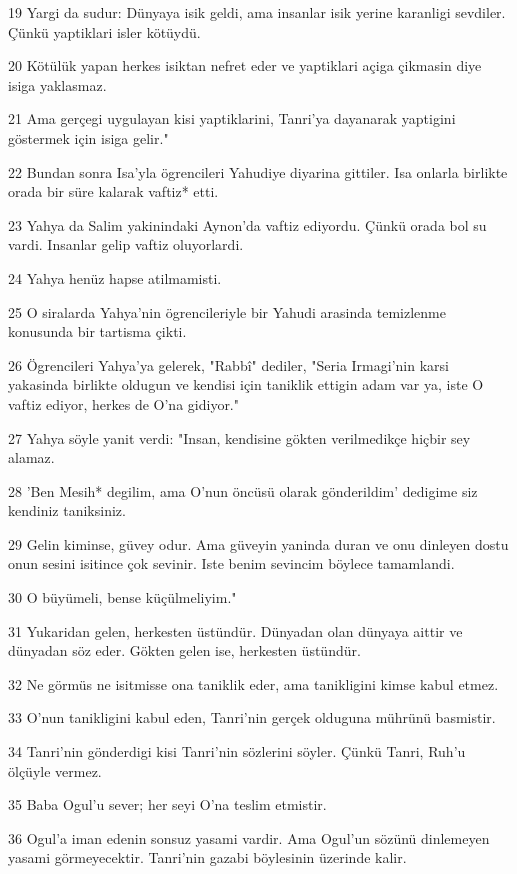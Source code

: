 \par 19 Yargi da sudur: Dünyaya isik geldi, ama insanlar isik yerine karanligi sevdiler. Çünkü yaptiklari isler kötüydü.
\par 20 Kötülük yapan herkes isiktan nefret eder ve yaptiklari açiga çikmasin diye isiga yaklasmaz.
\par 21 Ama gerçegi uygulayan kisi yaptiklarini, Tanri'ya dayanarak yaptigini göstermek için isiga gelir."
\par 22 Bundan sonra Isa'yla ögrencileri Yahudiye diyarina gittiler. Isa onlarla birlikte orada bir süre kalarak vaftiz* etti.
\par 23 Yahya da Salim yakinindaki Aynon'da vaftiz ediyordu. Çünkü orada bol su vardi. Insanlar gelip vaftiz oluyorlardi.
\par 24 Yahya henüz hapse atilmamisti.
\par 25 O siralarda Yahya'nin ögrencileriyle bir Yahudi arasinda temizlenme konusunda bir tartisma çikti.
\par 26 Ögrencileri Yahya'ya gelerek, "Rabbî" dediler, "Seria Irmagi'nin karsi yakasinda birlikte oldugun ve kendisi için taniklik ettigin adam var ya, iste O vaftiz ediyor, herkes de O'na gidiyor."
\par 27 Yahya söyle yanit verdi: "Insan, kendisine gökten verilmedikçe hiçbir sey alamaz.
\par 28 'Ben Mesih* degilim, ama O'nun öncüsü olarak gönderildim' dedigime siz kendiniz taniksiniz.
\par 29 Gelin kiminse, güvey odur. Ama güveyin yaninda duran ve onu dinleyen dostu onun sesini isitince çok sevinir. Iste benim sevincim böylece tamamlandi.
\par 30 O büyümeli, bense küçülmeliyim."
\par 31 Yukaridan gelen, herkesten üstündür. Dünyadan olan dünyaya aittir ve dünyadan söz eder. Gökten gelen ise, herkesten üstündür.
\par 32 Ne görmüs ne isitmisse ona taniklik eder, ama tanikligini kimse kabul etmez.
\par 33 O'nun tanikligini kabul eden, Tanri'nin gerçek olduguna mührünü basmistir.
\par 34 Tanri'nin gönderdigi kisi Tanri'nin sözlerini söyler. Çünkü Tanri, Ruh'u ölçüyle vermez.
\par 35 Baba Ogul'u sever; her seyi O'na teslim etmistir.
\par 36 Ogul'a iman edenin sonsuz yasami vardir. Ama Ogul'un sözünü dinlemeyen yasami görmeyecektir. Tanri'nin gazabi böylesinin üzerinde kalir.

